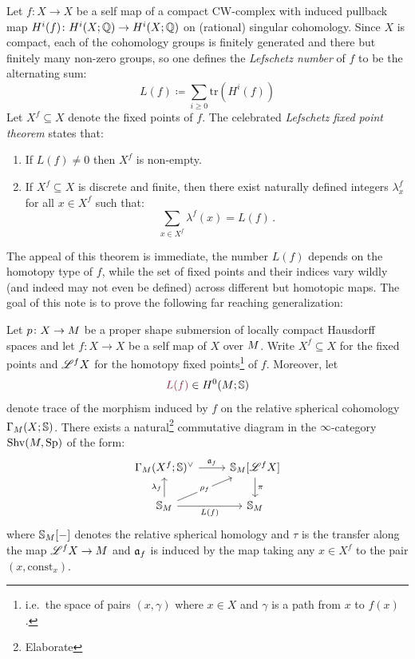 Let $f\colon X \to X$ be a self map of a compact CW-complex with induced pullback map
$H^i(f)\colon H^i(X;\mathbb{Q})\to H^i(X;\mathbb{Q})$ on (rational) singular cohomology. Since
$X$ is compact, each of the cohomology groups is finitely generated and there but finitely
many non-zero groups, so one defines the \emph{Lefschetz number} of $f$ to be the alternating sum:
\[ L(f)\coloneq\sum_{i\geq 0} \mathrm{tr}\left(H^i(f)\right)\]
Let $X^f\subseteq X$ denote the fixed points of $f$. 
The celebrated \emph{Lefschetz fixed point theorem} states that:
\begin{enumerate}
  \item If $L(f)\neq 0$ then $X^f$ is non-empty.
  \item If $X^f\subseteq X$ is discrete and finite, then there exist naturally
    defined integers $\lambda^f_x$ for all $x\in X^f$ such that:
    \[  \sum_{x \in X^f} \lambda^f(x) = L(f)\,.\]
\end{enumerate}
The appeal of this theorem is immediate, the number $L(f)$ depends on the homotopy
type of $f$, while the set of fixed points and their indices vary wildly
(and indeed may not even be defined) across different but homotopic maps.
The goal of this note is to prove the following far reaching generalization:

\begin{thm}\label{thm: main}
  Let $p\colon X \to M$ be a proper shape submersion of locally compact Hausdorff spaces
  and let $f\colon X \to X$ be a self map of $X$ over $M$. Write $X^f\subseteq X$ for
  the fixed points and $\mathscr{L}^f X$ for the homotopy fixed
  points\footnote{i.e.~the space of pairs $(x,\gamma)$ where $x\in X$
  and $\gamma$ is a path from $x$ to $f(x)$.} of $f$. Moreover, let
  \[\mdef{L(f)} \in H^0(\base; \SS)\]
  denote trace of the morphism induced by $f$ on the relative spherical cohomology 
$\Gamma_{M}(X;\mathbb{S})$.
  There exists a natural\footnote{Elaborate} commutative diagram in the $\infty$-category
  $\operatorname{Shv}(M,\operatorname{Sp})$ of the form:
  \[
\begin{tikzcd}
  {\Gamma_{M}(X^f;\SS)^\vee} & {\SS_{\base}[\cL^f X]} \\
	{\SS_{\base}} & {\SS_{\base}}
	\arrow["{\ass_f}", from=1-1, to=1-2]
	\arrow["\pi", from=1-2, to=2-2]
	\arrow["{\lambda_f}", from=2-1, to=1-1]
	\arrow["{\rho_f}"{description}, from=2-1, to=1-2]
	\arrow["{L(f)}"', from=2-1, to=2-2]
\end{tikzcd}
\]
where $\mathbb{S}_{M}[-]$ denotes the relative spherical homology and 
$\tau$ is the transfer along the map $\mathscr{L}^fX \to M$ and $\mathfrak{a}_f$ is induced
by the map taking any $x\in X^f$ to the pair $(x,\mathrm{const}_x).$
\end{thm}


